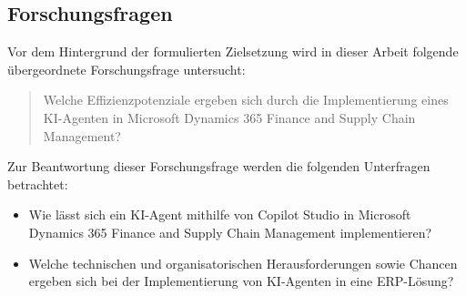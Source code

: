 \subsection{Forschungsfragen}

Vor dem Hintergrund der formulierten Zielsetzung wird in dieser Arbeit folgende übergeordnete Forschungsfrage untersucht:

\begin{quote}
Welche Effizienzpotenziale ergeben sich durch die Implementierung eines \ac{KI}-Agenten in Microsoft Dynamics 365 Finance and Supply Chain Management?
\end{quote}

Zur Beantwortung dieser Forschungsfrage werden die folgenden Unterfragen betrachtet:

\begin{itemize}
    \item Wie lässt sich ein \ac{KI}-Agent mithilfe von Copilot Studio in Microsoft Dynamics 365 Finance and Supply Chain Management implementieren?
    \item Welche technischen und organisatorischen Herausforderungen sowie Chancen ergeben sich bei der Implementierung von \ac{KI}-Agenten in eine \ac{ERP}-Lösung?
\end{itemize}
